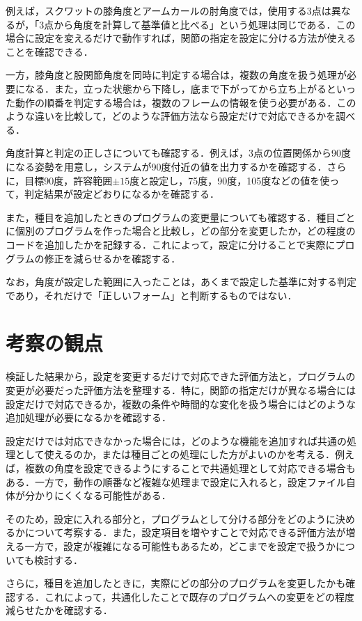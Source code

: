 \documentclass[no-page-number]{nanzan-abstract}
\begin{document}
例えば，スクワットの膝角度とアームカールの肘角度では，使用する3点は異なるが，「3点から角度を計算して基準値と比べる」という処理は同じである．この場合に設定を変えるだけで動作すれば，関節の指定を設定に分ける方法が使えることを確認できる．

一方，膝角度と股関節角度を同時に判定する場合は，複数の角度を扱う処理が必要になる．また，立った状態から下降し，底まで下がってから立ち上がるといった動作の順番を判定する場合は，複数のフレームの情報を使う必要がある．このような違いを比較して，どのような評価方法なら設定だけで対応できるかを調べる．

角度計算と判定の正しさについても確認する．例えば，3点の位置関係から90度になる姿勢を用意し，システムが90度付近の値を出力するかを確認する．さらに，目標90度，許容範囲$\pm15$度と設定し，75度，90度，105度などの値を使って，判定結果が設定どおりになるかを確認する．

また，種目を追加したときのプログラムの変更量についても確認する．種目ごとに個別のプログラムを作った場合と比較し，どの部分を変更したか，どの程度のコードを追加したかを記録する．これによって，設定に分けることで実際にプログラムの修正を減らせるかを確認する．

なお，角度が設定した範囲に入ったことは，あくまで設定した基準に対する判定であり，それだけで「正しいフォーム」と判断するものではない．


\section{考察の観点}

検証した結果から，設定を変更するだけで対応できた評価方法と，プログラムの変更が必要だった評価方法を整理する．特に，関節の指定だけが異なる場合には設定だけで対応できるか，複数の条件や時間的な変化を扱う場合にはどのような追加処理が必要になるかを確認する．

設定だけでは対応できなかった場合には，どのような機能を追加すれば共通の処理として使えるのか，または種目ごとの処理にした方がよいのかを考える．例えば，複数の角度を設定できるようにすることで共通処理として対応できる場合もある．一方で，動作の順番など複雑な処理まで設定に入れると，設定ファイル自体が分かりにくくなる可能性がある．

そのため，設定に入れる部分と，プログラムとして分ける部分をどのように決めるかについて考察する．また，設定項目を増やすことで対応できる評価方法が増える一方で，設定が複雑になる可能性もあるため，どこまでを設定で扱うかについても検討する．

さらに，種目を追加したときに，実際にどの部分のプログラムを変更したかも確認する．これによって，共通化したことで既存のプログラムへの変更をどの程度減らせたかを確認する．
\end{document}
